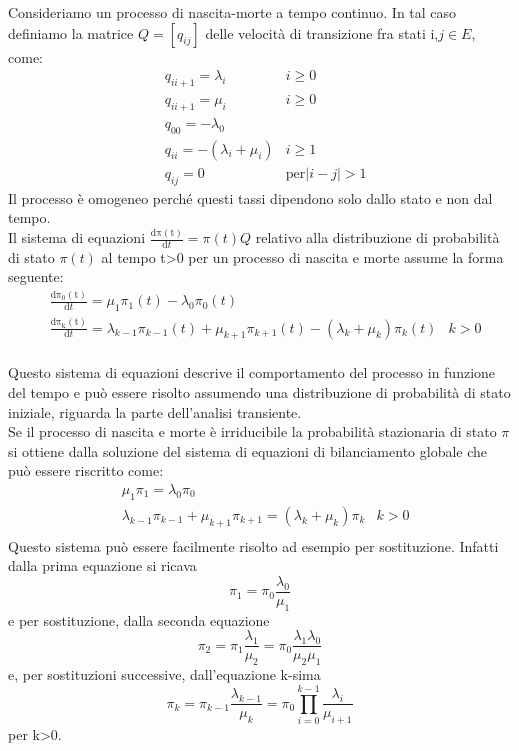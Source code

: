 Consideriamo un processo di nascita-morte a tempo continuo. In tal caso definiamo la matrice $Q = [q_{ij}]$ delle velocità di transizione fra stati i,$j\in E$, come:
\begin{align}
    & q_{i i+1} = \lambda_i & i \geq 0\\
    &q_{i i+1} = \mu_i & i \geq 0\\
    & q_{00} = -\lambda_0&\\
    & q_{ii} = -(\lambda_i + \mu_i) & i \geq 1\\
    & q_{ij} = 0 & \textrm{per}  |i-j| >1
\end{align}
Il processo è omogeneo perché questi tassi dipendono solo dallo stato e non dal tempo.\\
Il sistema di equazioni $\frac{\mathrm{d \pi (t)} }{\mathrm{d} t} = \pi(t) Q$  relativo alla distribuzione di probabilità di stato $\pi(t)$ al tempo t>0 per un processo di nascita e morte assume la forma seguente:
\begin{align}
    & \frac{\mathrm{d \pi_0 (t)} }{\mathrm{d} t} =  \mu_1 \pi_1(t) -\lambda_0 \pi_0(t) \\
    & \frac{\mathrm{d \pi_k (t)} }{\mathrm{d} t} =  \lambda_{k-1} \pi_{k-1}(t) + \mu_{k+1} \pi_{k+1}(t) - (\lambda_k + \mu_k) \pi_k(t)   & k >0\\
\end{align}

Questo sistema di equazioni descrive il comportamento del processo in funzione del
tempo e può essere risolto assumendo una distribuzione di probabilità di stato iniziale, riguarda la parte dell'analisi transiente.
\\
Se il processo di nascita e morte è irriducibile la probabilità stazionaria di stato $\pi$ si ottiene dalla soluzione del sistema di equazioni di bilanciamento globale che può essere riscritto come:
\begin{align}
    &\mu_1 \pi_1 = \lambda_0 \pi_0\\
    & \lambda_{k-1} \pi_{k-1} + \mu_{k+1} \pi_{k+1} = (\lambda_k + \mu_k)\pi_k & k>0\\
\end{align}
Questo sistema può essere facilmente risolto ad esempio per sostituzione. Infatti dalla
prima equazione si ricava
\[\pi_1 = \pi_0 \dfrac{\lambda_0}{\mu_1}\]
e per sostituzione, dalla seconda equazione
\[\pi_2 = \pi_1 \dfrac{\lambda_1}{\mu_2} = \pi_0 \dfrac{\lambda_1 \lambda_0}{\mu_2 \mu_1}\]
e, per sostituzioni successive, dall’equazione k-sima
\[\pi_k = \pi_{k-1} \dfrac{\lambda_{k-1}}{\mu_{k}} =\pi_0 \prod_{i=0}^{k-1} \dfrac{\lambda_i}{\mu_{i+1}}\]
per k>0.

